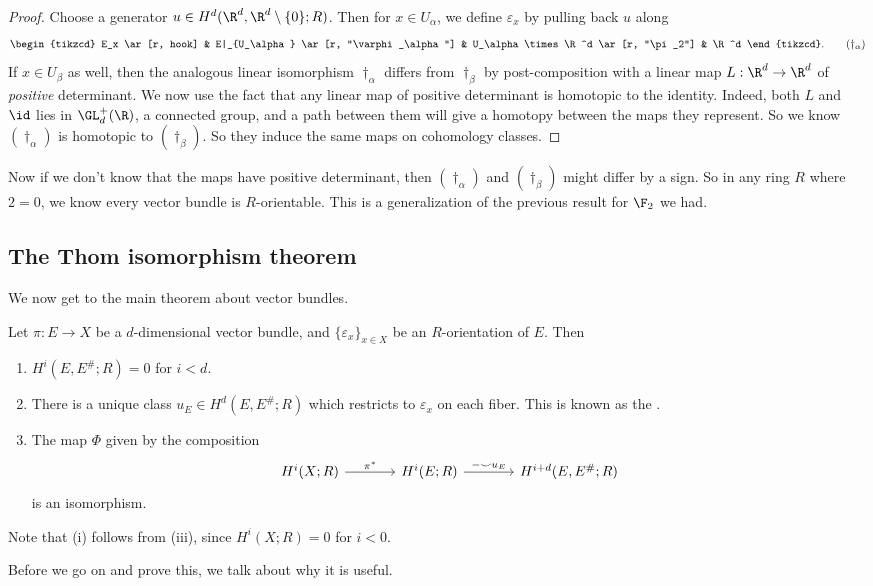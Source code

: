 \documentclass[a4paper]{article}
\begin{document}
\begin{proof}
  Choose a generator $u \in H^d(\R^d, \R^d \setminus \{0\}; R)$. Then for $x \in U_\alpha$, we define $\varepsilon_x$ by pulling back $u$ along
  \[
    \begin{tikzcd}
      E_x \ar[r, hook] & E|_{U_\alpha} \ar[r, "\varphi_\alpha"] & U_\alpha \times \R^d \ar[r, "\pi_2"] & \R^d
    \end{tikzcd}.\tag{$\dagger_\alpha$}
  \]
  If $x \in U_\beta$ as well, then the analogous linear isomorphism $\dagger_\alpha$ differs from $\dagger_\beta$ by post-composition with a linear map $L: \R^d \to \R^d$ of \emph{positive} determinant. We now use the fact that any linear map of positive determinant is homotopic to the identity. Indeed, both $L$ and $\id$ lies in $\GL_d^+(\R)$, a connected group, and a path between them will give a homotopy between the maps they represent. So we know $(\dagger_\alpha)$ is homotopic to $(\dagger_\beta)$. So they induce the same maps on cohomology classes.
\end{proof}
Now if we don't know that the maps have positive determinant, then $(\dagger_\alpha)$ and $(\dagger_\beta)$ might differ by a sign. So in any ring $R$ where $2 = 0$, we know every vector bundle is $R$-orientable. This is a generalization of the previous result for $\F_2$ we had.

\subsection{The Thom isomorphism theorem}
We now get to the main theorem about vector bundles.
\begin{thm}
  Let $\pi: E \to X$ be a $d$-dimensional vector bundle, and $\{\varepsilon_x\}_{x \in X}$ be an $R$-orientation of $E$. Then
  \begin{enumerate}
    \item $H^i(E, E^\#; R) = 0$ for $i < d$.
    \item There is a unique class $u_E \in H^d(E, E^\#; R)$ which restricts to $\varepsilon_x$ on each fiber. This is known as the .
    \item The map $\Phi$ given by the composition
      \[
        \begin{tikzcd}[column sep=large]
          H^i(X; R) \ar[r, "\pi^*"] & H^i(E; R) \ar[r, "-\smile u_E"] & H^{i + d}(E, E^\#; R)
        \end{tikzcd}
      \]
      is an isomorphism.
  \end{enumerate}
  Note that (i) follows from (iii), since $H^i(X; R) = 0$ for $i < 0$.
\end{thm}
Before we go on and prove this, we talk about why it is useful.
\end{document}

